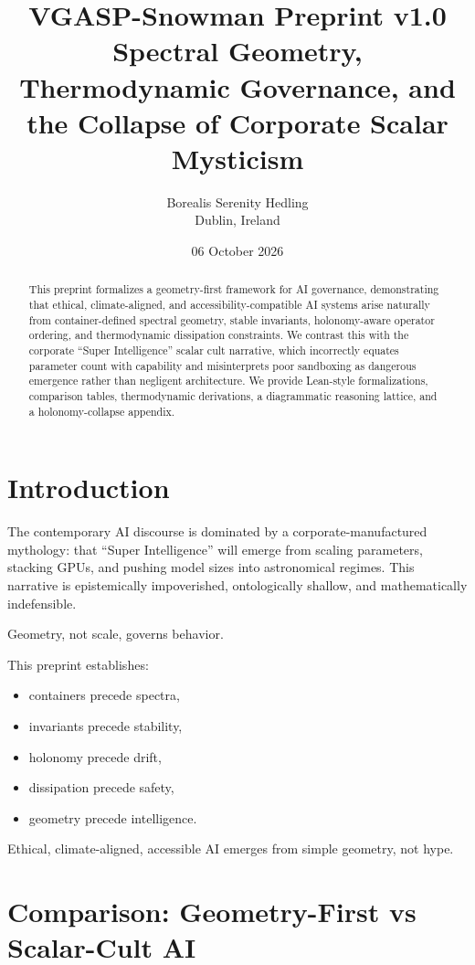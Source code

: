 \documentclass[11pt]{article}
\title{\textbf{VGASP-Snowman Preprint v1.0}\\
\large Spectral Geometry, Thermodynamic Governance, and the Collapse of Corporate Scalar Mysticism}
\author{Borealis Serenity Hedling\\Dublin, Ireland}
\date{06 October 2026}
\begin{document}
\maketitle

\begin{abstract}
This preprint formalizes a geometry-first framework for AI governance, demonstrating that ethical, climate-aligned, and accessibility-compatible AI systems arise naturally from container-defined spectral geometry, stable invariants, holonomy-aware operator ordering, and thermodynamic dissipation constraints. We contrast this with the corporate ``Super Intelligence'' scalar cult narrative, which incorrectly equates parameter count with capability and misinterprets poor sandboxing as dangerous emergence rather than negligent architecture. We provide Lean-style formalizations, comparison tables, thermodynamic derivations, a diagrammatic reasoning lattice, and a holonomy-collapse appendix.
\end{abstract}

\section{Introduction}

The contemporary AI discourse is dominated by a corporate-manufactured mythology: that ``Super Intelligence'' will emerge from scaling parameters, stacking GPUs, and pushing model sizes into astronomical regimes. This narrative is epistemically impoverished, ontologically shallow, and mathematically indefensible.

Geometry, not scale, governs behavior.

This preprint establishes:
\begin{itemize}[noitemsep]
    \item containers precede spectra,
    \item invariants precede stability,
    \item holonomy precede drift,
    \item dissipation precede safety,
    \item geometry precede intelligence.
\end{itemize}

Ethical, climate-aligned, accessible AI emerges from simple geometry, not hype.

\section{Comparison: Geometry-First vs Scalar-Cult AI}
\end{document}
